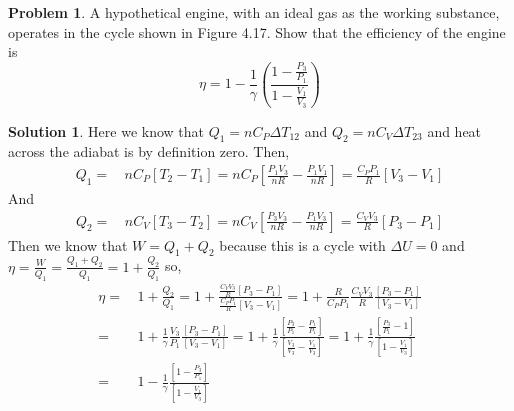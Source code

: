 \documentclass[10pt]{article}
\theoremstyle{definition}
\newtheorem{problem}{Problem}
\newtheorem{soln}{Solution}
\begin{document}
\begin{problem}
A hypothetical engine, with an ideal gas as the working substance, operates in the cycle shown in Figure 4.17. Show that the efficiency of the engine is
$$\eta=1-\frac{1}{\gamma}\left(\frac{1-\frac{P_3}{P_1}}{1-\frac{V_1}{V_3}}\right)$$
\end{problem}
\begin{soln}
  Here we know that $Q_1=nC_P\Delta T_{12}$ and $Q_2=nC_V\Delta T_{23}$ and heat across the adiabat is by definition zero. Then,
  \begin{align*}
    Q_1= & \, nC_P\left[T_2-T_1\right]=nC_P\left[\frac{P_1V_3}{nR}-\frac{P_1V_1}{nR}\right]=\frac{C_PP_1}{R}\left[V_3-V_1\right]
  \end{align*}
  And
  \begin{align*}
    Q_2= & \, nC_V\left[T_3-T_2\right]=nC_V\left[\frac{P_3V_3}{nR}-\frac{P_1V_3}{nR}\right]=\frac{C_VV_3}{R}\left[P_3-P_1\right]
  \end{align*}
  Then we know that $W=Q_1+Q_2$ because this is a cycle with $\Delta U=0$ and $\eta=\frac{W}{Q_1}=\frac{Q_1+Q_2}{Q_1}=1+\frac{Q_2}{Q_1}$ so,
  \begin{align*}
    \eta= & \,1+\frac{Q_2}{Q_1}=1+\frac{\frac{C_VV_3}{R}\left[P_3-P_1\right]}{\frac{C_PP_1}{R}\left[V_3-V_1\right]}=1+\frac{R}{C_PP_1}\frac{C_VV_3}{R}\frac{\left[P_3-P_1\right]}{\left[V_3-V_1\right]}                                                                                                      \\
    =     & \,1+\frac{1}{\gamma}\frac{V_3}{P_1}\frac{\left[P_3-P_1\right]}{\left[V_3-V_1\right]}=1+\frac{1}{\gamma}\frac{\left[\frac{P_3}{P_1}-\frac{P_1}{P_1}\right]}{\left[\frac{V_3}{V_3}-\frac{V_1}{V_3}\right]}=1+\frac{1}{\gamma}\frac{\left[\frac{P_3}{P_1}-1\right]}{\left[1-\frac{V_1}{V_3}\right]} \\
    =     & \,1-\frac{1}{\gamma}\frac{\left[1-\frac{P_3}{P_1}\right]}{\left[1-\frac{V_1}{V_3}\right]}
  \end{align*}
\end{soln}
\end{document}
